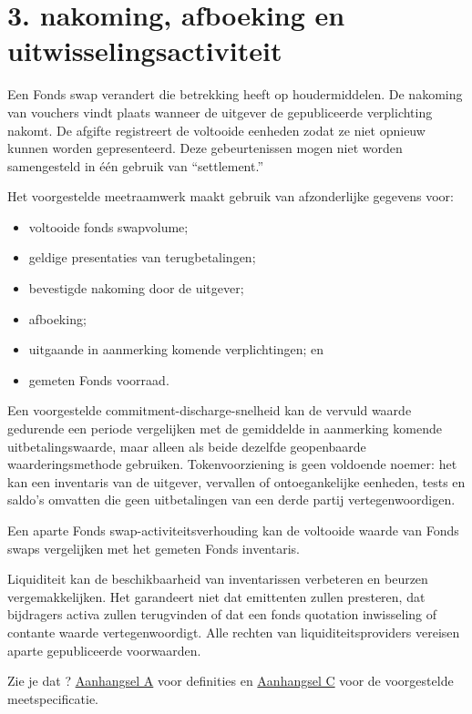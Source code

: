 \documentclass[11pt]{article}
\begin{document}
\section*{3. nakoming, afboeking en uitwisselingsactiviteit}

Een Fonds swap verandert die betrekking heeft op houdermiddelen. De nakoming van vouchers vindt plaats wanneer de uitgever de gepubliceerde verplichting nakomt. De afgifte registreert de voltooide eenheden zodat ze niet opnieuw kunnen worden gepresenteerd. Deze gebeurtenissen mogen niet worden samengesteld in één gebruik van ``settlement.''

Het voorgestelde meetraamwerk maakt gebruik van afzonderlijke gegevens voor:

\begin{itemize}[leftmargin=*]
\item voltooide fonds swapvolume;
\item geldige presentaties van terugbetalingen;
\item bevestigde nakoming door de uitgever;
\item afboeking;
\item uitgaande in aanmerking komende verplichtingen; en
\item gemeten Fonds voorraad.
\end{itemize}
Een voorgestelde commitment-discharge-snelheid kan de vervuld waarde gedurende een periode vergelijken met de gemiddelde in aanmerking komende uitbetalingswaarde, maar alleen als beide dezelfde geopenbaarde waarderingsmethode gebruiken. Tokenvoorziening is geen voldoende noemer: het kan een inventaris van de uitgever, vervallen of ontoegankelijke eenheden, tests en saldo's omvatten die geen uitbetalingen van een derde partij vertegenwoordigen.

Een aparte Fonds swap-activiteitsverhouding kan de voltooide waarde van Fonds swaps vergelijken met het gemeten Fonds inventaris.

Liquiditeit kan de beschikbaarheid van inventarissen verbeteren en beurzen vergemakkelijken. Het garandeert niet dat emittenten zullen presteren, dat bijdragers activa zullen terugvinden of dat een fonds quotation inwisseling of contante waarde vertegenwoordigt. Alle rechten van liquiditeitsproviders vereisen aparte gepubliceerde voorwaarden.

Zie je dat ? \href{https://docs.cosmolocal.credit/nl/white-paper/appendix-a-math-box}{Aanhangsel A} voor definities en \href{https://docs.cosmolocal.credit/nl/white-paper/appendix-c-kpi-definitions}{Aanhangsel C} voor de voorgestelde meetspecificatie.
\end{document}
